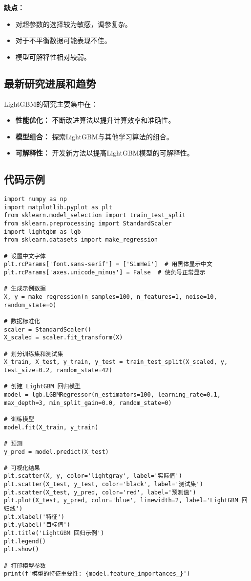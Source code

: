 \textbf{缺点：}
\begin{itemize}
    \item 对超参数的选择较为敏感，调参复杂。
    \item 对于不平衡数据可能表现不佳。
    \item 模型可解释性相对较弱。
\end{itemize}

\subsection*{最新研究进展和趋势}
LightGBM的研究主要集中在：
\begin{itemize}
    \item \textbf{性能优化：} 不断改进算法以提升计算效率和准确性。
    \item \textbf{模型组合：} 探索LightGBM与其他学习算法的组合。
    \item \textbf{可解释性：} 开发新方法以提高LightGBM模型的可解释性。
\end{itemize}
\subsection*{代码示例}
\begin{lstlisting}
import numpy as np
import matplotlib.pyplot as plt
from sklearn.model_selection import train_test_split
from sklearn.preprocessing import StandardScaler
import lightgbm as lgb
from sklearn.datasets import make_regression

# 设置中文字体
plt.rcParams['font.sans-serif'] = ['SimHei']  # 用黑体显示中文
plt.rcParams['axes.unicode_minus'] = False  # 使负号正常显示

# 生成示例数据
X, y = make_regression(n_samples=100, n_features=1, noise=10, random_state=0)

# 数据标准化
scaler = StandardScaler()
X_scaled = scaler.fit_transform(X)

# 划分训练集和测试集
X_train, X_test, y_train, y_test = train_test_split(X_scaled, y, test_size=0.2, random_state=42)

# 创建 LightGBM 回归模型
model = lgb.LGBMRegressor(n_estimators=100, learning_rate=0.1, max_depth=3, min_split_gain=0.0, random_state=0)

# 训练模型
model.fit(X_train, y_train)

# 预测
y_pred = model.predict(X_test)

# 可视化结果
plt.scatter(X, y, color='lightgray', label='实际值')
plt.scatter(X_test, y_test, color='black', label='测试集')
plt.scatter(X_test, y_pred, color='red', label='预测值')
plt.plot(X_test, y_pred, color='blue', linewidth=2, label='LightGBM 回归线')
plt.xlabel('特征')
plt.ylabel('目标值')
plt.title('LightGBM 回归示例')
plt.legend()
plt.show()

# 打印模型参数
print(f'模型的特征重要性: {model.feature_importances_}')

\end{lstlisting}



